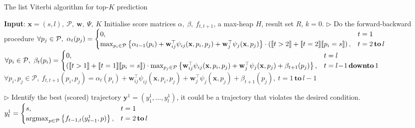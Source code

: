 \begin{algorithm}[htbp]
\caption{The list Viterbi algorithm for top-$K$ prediction~\cite{seshadri1994list}}

\onehalfspacing

\begin{algorithmic}[1]
\STATE \textbf{Input}: $\mathbf{x}=(s, l),~ \mathcal{P},~ \mathbf{w},~ \Psi, ~K$
\STATE Initialise score matrices $\alpha,~ \beta,~ f_{t, t+1}$, a max-heap $H$, result set $R$, $k=0$.
\STATE $\triangleright$ Do the forward-backward procedure
\STATE $\forall p_j \in \mathcal{P},~ \alpha_t(p_j) =
        \begin{cases}
         0, & t = 1 \\
         \max_{p_i \in \mathcal{P}} \left\{ \alpha_{t-1}(p_i) + \mathbf{w}_{ij}^\top \psi_{ij}(\mathbf{x}, p_i, p_j) +
         \mathbf{w}_j^\top \psi_j(\mathbf{x}, p_j) \right\} \cdot 
         \left( \llbracket t > 2 \rrbracket + \llbracket t = 2 \rrbracket \llbracket p_i = s \rrbracket \right), & t=2 \, \textbf{to} \, l
        \end{cases}$
\STATE $\forall p_i \in \mathcal{P},~ \beta_t(p_i) =
         \begin{cases}
          0, & t = l \\
          \left( \llbracket t > 1 \rrbracket + \llbracket t = 1 \rrbracket \llbracket p_i = s \rrbracket \right) \cdot 
          \max_{p_j \in \mathcal{P}} \left\{ \mathbf{w}_{ij}^\top \psi_{ij}(\mathbf{x}, p_i, p_j) +
          \mathbf{w}_j^\top \psi_j(\mathbf{x}, p_j) + \beta_{t+1}(p_j) \right\}, & t = l\!-\!1 \, \textbf{downto} \, 1
         \end{cases}$
\STATE $\forall p_i, p_j \in \mathcal{P},~ f_{t,t+1}(p_i, p_j) = \alpha_t(p_i) + \mathbf{w}_{ij}^\top \psi_{ij}(\mathbf{x}, p_i, p_j) +
                             \mathbf{w}_j^\top \psi_j(\mathbf{x}, p_j) + \beta_{t+1}(p_j),~ t = 1 \, \textbf{to} \, l\!-\!1$

\STATE $\triangleright$ Identify the best (scored) trajectory $\mathbf{y}^1=(y_1^1,\dots,y_l^1)$, it could be a trajectory that violates the desired condition.
\STATE $y_t^1 = \begin{cases}
                  s, & t = 1 \\
                  \operatorname*{argmax}_{p \in \mathcal{P}} \left\{ f_{t-1,t}(y_{t-1}^1, p) \right\}, & t = 2 \, \textbf{to} \, l
                 \end{cases}$


\end{algorithmic}
\end{algorithm}
